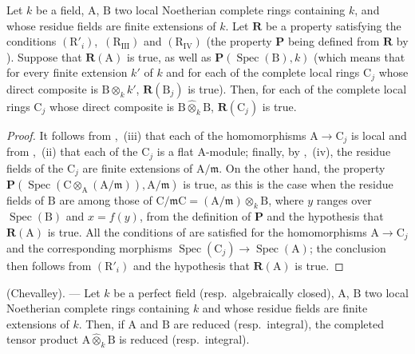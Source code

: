 \begin{proposition}[7.5.6]
\label{IV.7.5.6}
Let $k$ be a field, $\mathrm{A}$, $\mathrm{B}$ two local Noetherian complete rings containing $k$, and whose residue fields are finite extensions of $k$. Let $\boldsymbol{R}$ be a property satisfying the conditions $(\mathrm{R}'_i)$,~$(\mathrm{R}_{\mathrm{III}})$ and $(\mathrm{R}_{\mathrm{IV}})$ (the property $\boldsymbol{P}$ being defined from $\boldsymbol{R}$ by ). Suppose that $\boldsymbol{R}(\mathrm{A})$ is true, as well as $\boldsymbol{P}(\operatorname{Spec}(\mathrm{B}),k)$ (which means that for every finite extension $k'$ of $k$ and for each of the complete local rings $\mathrm{C}_j$ whose direct composite is $\mathrm{B}\otimes_k k'$, $\boldsymbol{R}(\mathrm{B}_j)$ is true). Then, for each of the complete local rings $\mathrm{C}_j$ whose direct composite is $\mathrm{B}\widehat{\otimes}_k\mathrm{B}$, $\boldsymbol{R}(\mathrm{C}_j)$ is true.
\end{proposition}

\begin{proof}
It follows from ,~(iii) that each of the homomorphisms $\mathrm{A}\to\mathrm{C}_j$ is local and from ,~(ii) that each of the $\mathrm{C}_j$ is a flat $\mathrm{A}$-module; finally, by ,~(iv), the residue fields of the $\mathrm{C}_j$ are finite extensions of $\mathrm{A}/\mathfrak{m}$. On the other hand, the property $\boldsymbol{P}(\operatorname{Spec}(\mathrm{C}\otimes_\mathrm{A}(\mathrm{A}/\mathfrak{m})),\mathrm{A}/\mathfrak{m})$ is true, as this is the case when the residue fields of $\mathrm{B}$ are among those of $\mathrm{C}/\mathfrak{m}\mathrm{C}=(\mathrm{A}/\mathfrak{m})\otimes_k\mathrm{B}$, where $y$ ranges over $\operatorname{Spec}(\mathrm{B})$ and $x=f(y)$, from the definition of $\boldsymbol{P}$ and the hypothesis that $\boldsymbol{R}(\mathrm{A})$ is true. All the conditions of  are satisfied for the homomorphisms $\mathrm{A}\to\mathrm{C}_j$ and the corresponding morphisms $\operatorname{Spec}(\mathrm{C}_j)\to\operatorname{Spec}(\mathrm{A})$; the conclusion then follows from $(\mathrm{R}'_i)$ and the hypothesis that $\boldsymbol{R}(\mathrm{A})$ is true.
\end{proof}

\begin{corollary}[7.5.7]
\label{IV.7.5.7}
(Chevalley). --- Let $k$ be a perfect field (resp.\ algebraically closed), $\mathrm{A}$, $\mathrm{B}$ two local Noetherian complete rings containing $k$ and whose residue fields are finite extensions of $k$. Then, if $\mathrm{A}$ and $\mathrm{B}$ are reduced (resp.\ integral), the completed tensor product $\mathrm{A}\widehat{\otimes}_k\mathrm{B}$ is reduced (resp.\ integral).
\end{corollary}

